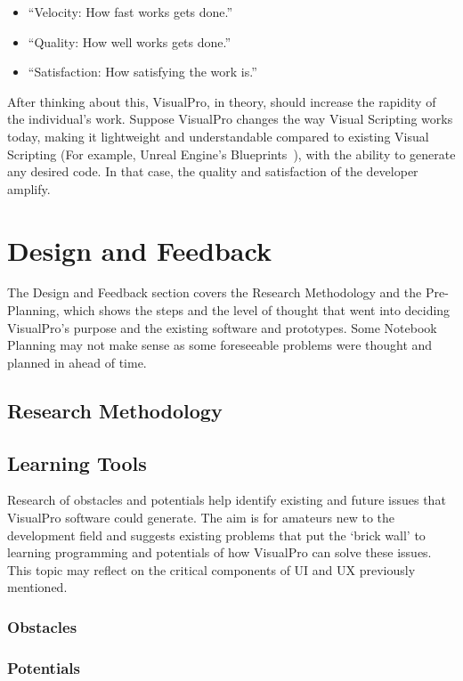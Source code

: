 \documentclass[conference]{IEEEtran}
\begin{document}
      \begin{itemize}
        \item ``Velocity: How fast works gets done.''
        \item ``Quality: How well works gets done.''
        \item ``Satisfaction: How satisfying the work is.''
      \end{itemize}

      After thinking about this, VisualPro, in theory, should increase the rapidity of the individual’s work. Suppose VisualPro changes the way Visual Scripting works today, making it lightweight and understandable compared to existing Visual Scripting (For example, Unreal Engine's Blueprints~\cite{unreal_engine_introduction_nodate}), with the ability to generate any desired code. In that case, the quality and satisfaction of the developer amplify.

    \section{Design and Feedback}
    \label{sec:designAndFeedback}
      The Design and Feedback section covers the Research Methodology and the Pre-Planning, which shows the steps and the level of thought that went into deciding VisualPro's purpose and the existing software and prototypes. Some Notebook Planning may not make sense as some foreseeable problems were thought and planned in ahead of time.

      \subsection{Research Methodology}
      \label{subsec:researchMethodology}
        \subsection{Learning Tools}
          Research of obstacles and potentials help identify existing and future issues that VisualPro software could generate. The aim is for amateurs new to the development field and suggests existing problems that put the `brick wall' to learning programming and potentials of how VisualPro can solve these issues. This topic may reflect on the critical components of UI and UX previously mentioned.
          \subsubsection{Obstacles}
          \subsubsection{Potentials}
\end{document}
